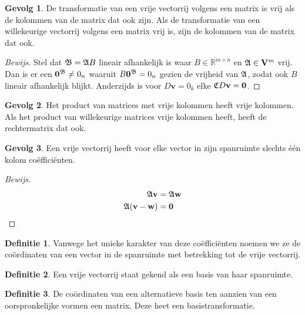 \documentclass{amsart}
\theoremstyle{definition}
\newtheorem{dfn}{Definitie}[section]
\newtheorem{csq}{Gevolg}[section]
\newenvironment{bewijs}{\begin{proof}[Bewijs]}{\end{proof}}
\newcommand{\realnums}{\mathbb{R}}
\newcommand{\realn}[1][n]{\realnums^{#1}}
\newcommand{\realmx}[2][n]{\realn[#2 \times #1]}
\newcommand{\realmxn}{\realmx{m}}
\newcommand{\vecspace}[1][v]{\mathrm{\mathbf{\MakeUppercase#1}}}
\newcommand{\vecspacen}[1][n]{\vecspace^#1}
\newcommand{\vvec}[1][v]{\mathbf{#1}}
\newcommand{\zerovec}{\vvec[0]}
\newcommand{\vecrow}[1][a]{\mathfrak{\MakeUppercase{#1}}}
\newcommand{\cvec}[2]{{#1}^{#2}}
\newcommand{\cvecv}[2][v]{\cvec{\vvec[#1]}{#2}}
\newcommand{\cvecc}[2][a]{\cvecv[#2]{\vecrow[#1]}}
\begin{document}
\begin{csq}
	De transformatie van een vrije vectorrij volgens een matrix is vrij als de kolommen van de matrix dat ook zijn. Als de transformatie van een willekeurige vectorrij volgens een matrix vrij is, zijn de kolommen van de matrix dat ook.
	\begin{bewijs}
		Stel dat $\vecrow[b] = \vecrow B$ lineair afhankelijk is waar $B \in \realmxn$ en $\vecrow \in \vecspacen[m]$ vrij.
		Dan is er een $\cvecc[b]{0} \neq 0_n$ waaruit $B \cvecc[b]{0} = 0_n$ gezien de vrijheid van $\vecrow$, zodat ook $B$ lineair afhankelijk blijkt.
		Anderzijds is voor $D\vvec = 0_k$ elke $\vecrow[c] D\vvec = \zerovec$.
	\end{bewijs}
\end{csq}

\begin{csq}
	Het product van matrices met vrije kolommen heeft vrije kolommen. Als het product van willekeurige matrices vrije kolommen heeft, heeft de rechtermatrix dat ook.
\end{csq}

\begin{csq}
	Een vrije vectorrij heeft voor elke vector in zijn spanruimte slechts één kolom coëfficiënten.
	\begin{bewijs}
		\begin{align*}
			\vecrow \vvec              & = \vecrow \vvec[w] \\
			\vecrow (\vvec - \vvec[w]) & = \zerovec
		\end{align*}
	\end{bewijs}
\end{csq}

\begin{dfn}
	Vanwege het unieke karakter van deze coëfficiënten noemen we ze de coördinaten van een vector in de spanruimte met betrekking tot de vrije vectorrij.
\end{dfn}

\begin{dfn}
	Een vrije vectorrij staat gekend als een basis van haar spanruimte.
\end{dfn}

\begin{dfn}
	De coördinaten van een alternatieve basis ten aanzien van een oorspronkelijke vormen een matrix.
	Deze heet een basistransformatie.
\end{dfn}
\end{document}
